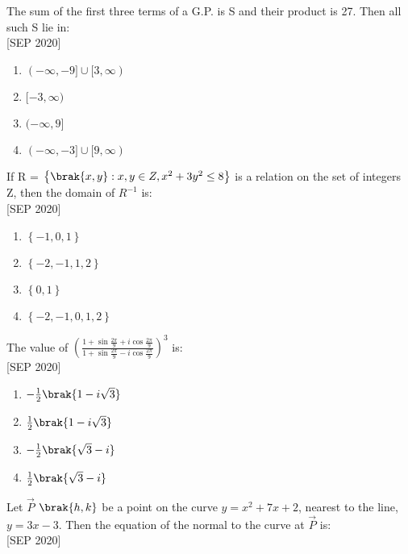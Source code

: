     \item The sum of the first three terms of a G.P. is S and their product is 27. Then all such S lie in: \\\hfill{[SEP 2020]}
    \begin{multicols}{2}
    \begin{enumerate}
        \item $(-\infty,-9]\cup[3,\infty)$
        \item $[-3,\infty)$
        \item $(-\infty,9]$
        \item $(-\infty,-3]\cup[9,\infty)$
    \end{enumerate} 
    \end{multicols}
    \item If R = $\left\{\brak{x,y} : x,y \in Z , x^2 + 3y^2 \leq 8\right\}$ is a relation on the set of integers Z, then the domain of $R^{-1}$ is: \\\hfill{[SEP 2020]}
    \begin{multicols}{4}
    \begin{enumerate}
        \item $\left\{-1,0,1\right\}$
        \item $\left\{-2,-1,1,2\right\}$
        \item $\left\{0,1\right\}$
        \item $\left\{-2,-1,0,1,2\right\}$
    \end{enumerate} 
    \end{multicols}
    \item The value of ${\left(\frac{1 + \sin{\frac{2\pi}{9}} + i\cos{\frac{2\pi}{9}}}{1 + \sin{\frac{2\pi}{9}} - i\cos{\frac{2\pi}{9}}}\right)}^3$ is: \\\hfill{[SEP 2020]}
    \begin{multicols}{4}
    \begin{enumerate}
        \item $-\frac{1}{2}\brak{1 - i\sqrt{3}}$
        \item $\frac{1}{2}\brak{1 - i\sqrt{3}}$
        \item $-\frac{1}{2}\brak{\sqrt{3} - i}$
        \item $\frac{1}{2}\brak{\sqrt{3} - i}$
    \end{enumerate} 
    \end{multicols}
    \item Let $\vec{P}$ $\brak{h,k}$ be a point on the curve $y=x^2+7x+2$, nearest to the line, $y=3x-3$. Then the equation of the normal to the curve at $\vec{P}$ is: \\\hfill{[SEP 2020]}
